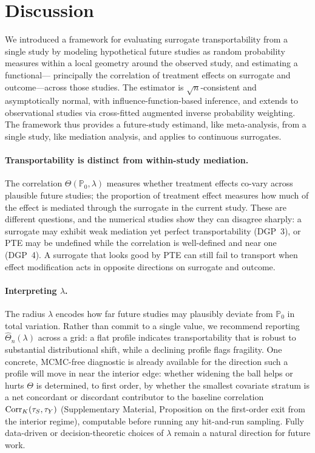 \documentclass{article}
\newcommand{\PP}{\mathbb{P}}
\begin{document}
\section{Discussion}\label{sec:discussion}

We introduced a framework for evaluating surrogate transportability from a single
study by modeling hypothetical future studies as random probability measures
within a local geometry around the observed study, and estimating a functional---
principally the correlation of treatment effects on surrogate and outcome---across
those studies. The estimator is $\sqrt{n}$-consistent and asymptotically normal,
with influence-function-based inference, and extends to observational studies via
cross-fitted augmented inverse probability weighting. The framework thus provides
a future-study estimand, like meta-analysis, from a single study, like mediation
analysis, and applies to continuous surrogates.

\paragraph{Transportability is distinct from within-study mediation.}
The correlation $\Theta(\PP_0, \lambda)$ measures whether treatment effects
co-vary across plausible future studies; the proportion of treatment effect
measures how much of the effect is mediated through the surrogate in the current
study. These are different questions, and the numerical studies show they can
disagree sharply: a surrogate may exhibit weak mediation yet perfect
transportability (DGP~3), or PTE may be undefined while the correlation is
well-defined and near one (DGP~4). A surrogate that looks good by PTE can still
fail to transport when effect modification acts in opposite directions on
surrogate and outcome.

\paragraph{Interpreting $\lambda$.}
The radius $\lambda$ encodes how far future studies may plausibly deviate from
$\PP_0$ in total variation. Rather than commit to a single value, we recommend
reporting $\hat{\Theta}_n(\lambda)$ across a grid: a flat profile indicates
transportability that is robust to substantial distributional shift, while a
declining profile flags fragility. One concrete, MCMC-free diagnostic is already
available for the direction such a profile will move in near the interior edge:
whether widening the ball helps or hurts $\Theta$ is determined, to first order, by
whether the smallest covariate stratum is a net concordant or discordant
contributor to the baseline correlation $\operatorname{Corr}_K(\tau_S,\tau_Y)$ (Supplementary
Material, Proposition on the first-order exit from the interior regime), computable
before running any hit-and-run sampling. Fully data-driven or decision-theoretic
choices of $\lambda$ remain a natural direction for future work.
\end{document}
